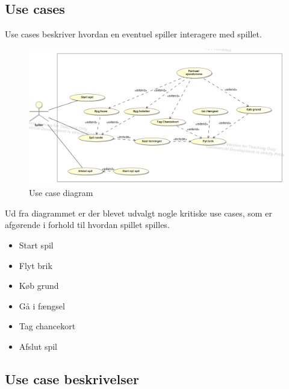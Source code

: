 \subsection{Use cases}
Use cases beskriver hvordan en eventuel spiller interagere med spillet. 
\begin{figure}[h]
    \centering
    \includegraphics[width=\textwidth]{sources/5_analyse/UseCaseDiagram.PNG}
    \caption{Use case diagram}
    \label{fig:UC1}
\end{figure}

Ud fra diagrammet er der blevet udvalgt nogle kritiske use cases, som er afgørende i forhold til hvordan spillet spilles. 

\begin{itemize}
    \item Start spil
    \item Flyt brik
    \item Køb grund
    \item Gå i fængsel
    \item Tag chancekort
    \item Afslut spil
\end{itemize}

\newpage
\subsection{Use case beskrivelser}

